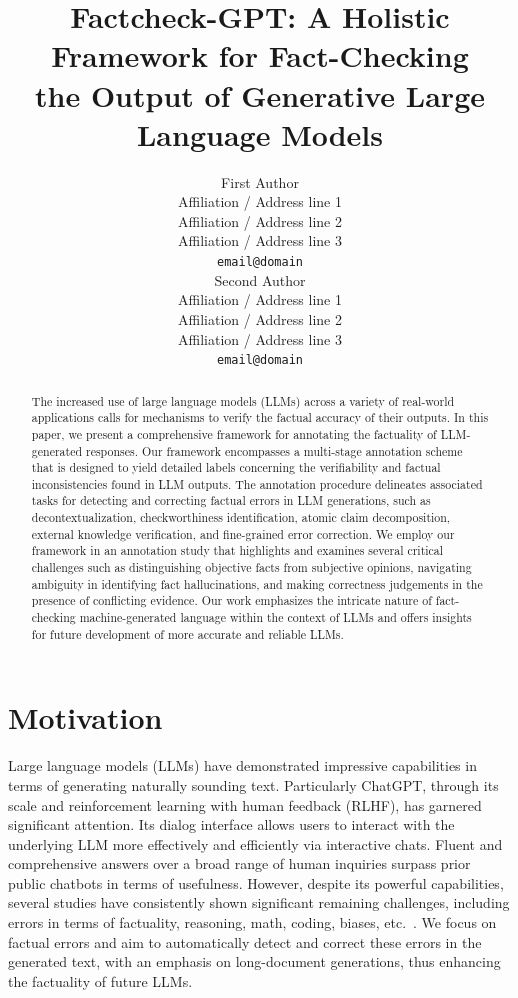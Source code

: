 \documentclass[11pt]{article}
\title{Factcheck-GPT: A Holistic Framework for Fact-Checking\\ the Output of Generative Large Language Models}
\author{First Author \\
  Affiliation / Address line 1 \\
  Affiliation / Address line 2 \\
  Affiliation / Address line 3 \\
  \texttt{email@domain} \\\And
  Second Author \\
  Affiliation / Address line 1 \\
  Affiliation / Address line 2 \\
  Affiliation / Address line 3 \\
  \texttt{email@domain} \\}
\begin{document}
\maketitle
\begin{abstract}
The increased use of large language models (LLMs) across a variety of real-world applications calls for mechanisms to verify the factual accuracy of their outputs. In this paper, we present a comprehensive framework for annotating the factuality of LLM-generated responses. Our framework encompasses a multi-stage annotation scheme that is designed to yield detailed labels concerning the verifiability and factual inconsistencies found in LLM outputs. The annotation procedure delineates associated tasks for detecting and correcting factual errors in LLM generations, such as decontextualization, checkworthiness identification, atomic claim decomposition, external knowledge verification, and fine-grained error correction. We employ our framework in an annotation study that highlights and examines several critical challenges such as distinguishing objective facts from subjective opinions, navigating ambiguity in identifying fact hallucinations, and making correctness judgements in the presence of conflicting evidence.
Our work emphasizes the intricate nature of fact-checking machine-generated language within the context of LLMs and offers insights for future development of more accurate and reliable LLMs.


\end{abstract}

\section{Motivation}
Large language models (LLMs) have demonstrated impressive capabilities in terms of generating naturally sounding text. 
Particularly ChatGPT, through its scale and reinforcement learning with human feedback (RLHF), has garnered significant attention.
Its dialog interface allows users to interact with the underlying LLM more effectively and efficiently via interactive chats.
Fluent and comprehensive answers over a broad range of human inquiries surpass prior public chatbots in terms of usefulness.
However, despite its powerful capabilities, several studies have consistently shown significant remaining challenges, including errors in terms of factuality, reasoning, math, coding, biases, etc.~\citep{bang2023multichatgpt, ali2023failurechatgpt, giuven2023llmsfailures}.
We focus on factual errors and aim to automatically detect and correct these errors in the generated text, with an emphasis on long-document generations, thus enhancing the factuality of future LLMs.
\end{document}
